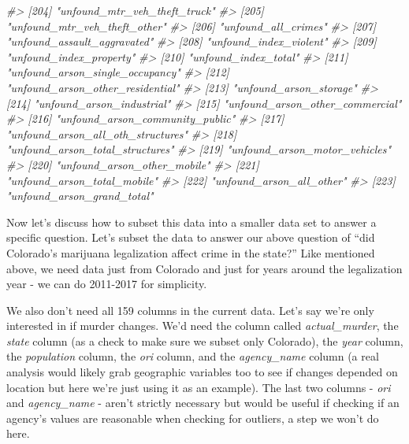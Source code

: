 \documentclass[
]{krantz}
\makeatletter
\newenvironment{Shaded}{\begin{snugshade}}{\end{snugshade}}
\newcommand{\CommentTok}[1]{\textcolor[rgb]{0.37,0.37,0.37}{\textit{#1}}}
\newenvironment{kframe}{%
\medskip{}
\setlength{\fboxsep}{.8em}
 \def\at@end@of@kframe{}%
 \ifinner\ifhmode%
  \def\at@end@of@kframe{\end{minipage}}%
  \begin{minipage}{\columnwidth}%
 \fi\fi%
 \def\FrameCommand##1{\hskip\@totalleftmargin \hskip-\fboxsep
 \colorbox{shadecolor}{##1}\hskip-\fboxsep
     \hskip-\linewidth \hskip-\@totalleftmargin \hskip\columnwidth}%
 \MakeFramed {\advance\hsize-\width
   \@totalleftmargin\z@ \linewidth\hsize
   \@setminipage}}%
 {\par\unskip\endMakeFramed%
 \at@end@of@kframe}
\renewenvironment{Shaded}{\begin{kframe}}{\end{kframe}}
\makeatother
\begin{document}
\begin{Shaded}
\begin{Highlighting}[]
\CommentTok{\#\textgreater{} [204] "unfound\_mtr\_veh\_theft\_truck"     }
\CommentTok{\#\textgreater{} [205] "unfound\_mtr\_veh\_theft\_other"     }
\CommentTok{\#\textgreater{} [206] "unfound\_all\_crimes"              }
\CommentTok{\#\textgreater{} [207] "unfound\_assault\_aggravated"      }
\CommentTok{\#\textgreater{} [208] "unfound\_index\_violent"           }
\CommentTok{\#\textgreater{} [209] "unfound\_index\_property"          }
\CommentTok{\#\textgreater{} [210] "unfound\_index\_total"             }
\CommentTok{\#\textgreater{} [211] "unfound\_arson\_single\_occupancy"  }
\CommentTok{\#\textgreater{} [212] "unfound\_arson\_other\_residential" }
\CommentTok{\#\textgreater{} [213] "unfound\_arson\_storage"           }
\CommentTok{\#\textgreater{} [214] "unfound\_arson\_industrial"        }
\CommentTok{\#\textgreater{} [215] "unfound\_arson\_other\_commercial"  }
\CommentTok{\#\textgreater{} [216] "unfound\_arson\_community\_public"  }
\CommentTok{\#\textgreater{} [217] "unfound\_arson\_all\_oth\_structures"}
\CommentTok{\#\textgreater{} [218] "unfound\_arson\_total\_structures"  }
\CommentTok{\#\textgreater{} [219] "unfound\_arson\_motor\_vehicles"    }
\CommentTok{\#\textgreater{} [220] "unfound\_arson\_other\_mobile"      }
\CommentTok{\#\textgreater{} [221] "unfound\_arson\_total\_mobile"      }
\CommentTok{\#\textgreater{} [222] "unfound\_arson\_all\_other"         }
\CommentTok{\#\textgreater{} [223] "unfound\_arson\_grand\_total"}
\end{Highlighting}
\end{Shaded}

Now let's discuss how to subset this data into a smaller data set to answer a specific question. Let's subset the data to answer our above question of ``did Colorado's marijuana legalization affect crime in the state?'' Like mentioned above, we need data just from Colorado and just for years around the legalization year - we can do 2011-2017 for simplicity.

We also don't need all 159 columns in the current data. Let's say we're only interested in if murder changes. We'd need the column called \emph{actual\_murder}, the \emph{state} column (as a check to make sure we subset only Colorado), the \emph{year} column, the \emph{population} column, the \emph{ori} column, and the \emph{agency\_name} column (a real analysis would likely grab geographic variables too to see if changes depended on location but here we're just using it as an example). The last two columns - \emph{ori} and \emph{agency\_name} - aren't strictly necessary but would be useful if checking if an agency's values are reasonable when checking for outliers, a step we won't do here.
\end{document}
